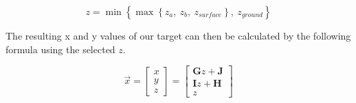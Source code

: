 \begin{equation}
	z=\min\left\{\max\left\{z_a,~z_b,~z_{surface}\right\},~z_{ground}\right\}
\end{equation}	

The resulting x and y values of our target can then be calculated by the following formula using the selected $z$.

\begin{equation}
			\vec{x}
	=\left[
	\begin{array}{c}
		x\\
		y\\
		z
	\end{array}
	\right]
=\left[
	\begin{array}{c}
		\mathbf{G}z+\mathbf{J}\\
		\mathbf{I}z+\mathbf{H}\\
		z
	\end{array}
	\right]
\end{equation}	
